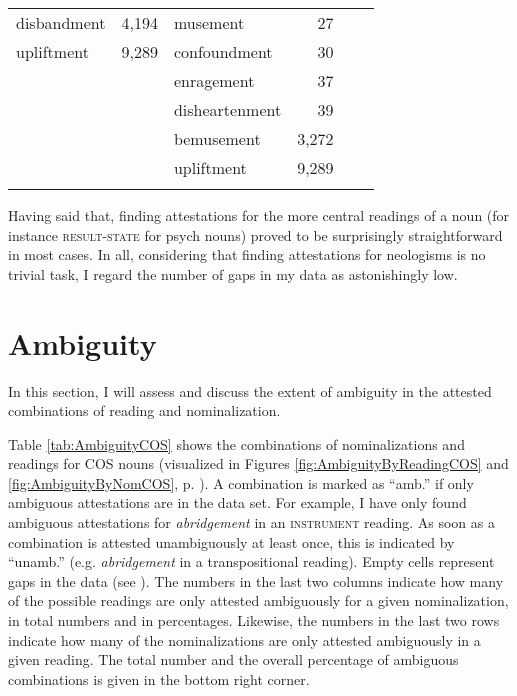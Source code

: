\begin{table}
\begin{tabular}{lrlrlr}
disbandment   & 4,194     & musement       & 27        &                  &            \\
upliftment    & 9,289     & confoundment   & 30        &                  &            \\
&           & enragement     & 37        &                  &            \\
&           & disheartenment & 39        &                  &            \\
&           & bemusement     & 3,272     &                  &            \\
&           & upliftment     & 9,289     &                  &   \\
			\lspbottomrule
		\end{tabular}
\end{table}

Having said that, finding attestations for the more central readings of a noun (for instance \textsc{result-state} for psych nouns) proved to be surprisingly straightforward in most cases. In all, considering that finding attestations for neologisms is no trivial task, I regard the number of gaps in my data as astonishingly low.

\section{Ambiguity}
\label{sec:obs-amb}

In this section, I will assess and discuss the extent of ambiguity in the attested combinations of reading and nominalization.

Table \ref{tab:AmbiguityCOS} shows the combinations of nominalizations and readings for COS nouns (visualized in Figures \ref{fig:AmbiguityByReadingCOS} and \ref{fig:AmbiguityByNomCOS}, p. \pageref{fig:AmbiguityByReadingCOS}). A combination is marked as ``amb.'' if only ambiguous attestations are in the data set. For example, I have only found ambiguous attestations for \textit{abridgement} in an \textsc{instrument} reading. As soon as a combination is attested unambiguously at least once, this is indicated by ``unamb.'' (e.g. \textit{abridgement} in a transpositional reading). Empty cells represent gaps in the data (see ). The numbers in the last two columns indicate how many of the possible readings are only attested ambiguously for a given nominalization, in total numbers and in percentages. Likewise, the numbers in the last two rows indicate how many of the nominalizations are only attested ambiguously in a given reading. The total number and the overall percentage of ambiguous combinations is given in the bottom right corner. 

